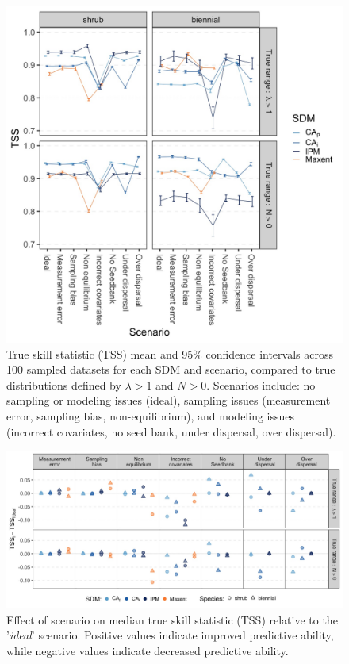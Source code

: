 \documentclass[preprint,review,times,12pt]{elsarticle}
\begin{document}
\begin{figure}
	\centering\includegraphics[width=5in]{../../figs/fig_TSS_mn+CI.jpg}
	\caption{\label{fig:TSSmn} True skill statistic (TSS) mean and 95\% confidence intervals across 100 sampled datasets for each SDM and scenario, compared to true distributions defined by $\lambda > 1$ and $N > 0$. Scenarios include: no sampling or modeling issues (ideal), sampling issues (measurement error, sampling bias, non-equilibrium), and modeling issues (incorrect covariates, no seed bank, under dispersal, over dispersal).}
\end{figure}

\begin{figure}
	\centering\includegraphics[width=\linewidth]{../../figs/fig_TSSvIdeal.jpg}
	\caption{\label{fig:TSSvIdeal} Effect of scenario on median true skill statistic (TSS) relative to the '\emph{ideal}' scenario. Positive values indicate improved predictive ability, while negative values indicate decreased predictive ability.}
\end{figure}
\end{document}
